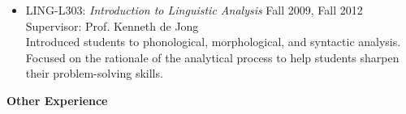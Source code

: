 \begin{singlespace}
\begin{itemize}
\item LING-L303: \textit{Introduction to Linguistic Analysis}
\hfill Fall 2009, Fall 2012 \\
Supervisor: Prof. Kenneth de Jong \\
Introduced students to phonological, morphological, and syntactic analysis. Focused on the rationale of the analytical process to help students sharpen their problem-solving skills.
\end{itemize}
\vspace{13pt}
\centerline{\textbf{\large Other Experience}}

\end{singlespace}
